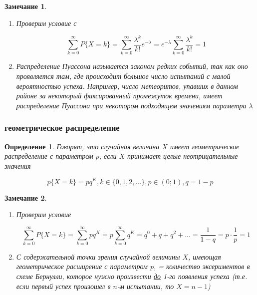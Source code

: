 \documentclass[a4paper, 14pt]{report}
\newtheorem{defenition}{Определение}[section]
\newtheorem{note}{Замечание}[section]
\begin{document}
\begin{note}
    \begin{enumerate}
        \item Проверим условие с 

            $$
            \sum_{k=0}^{\infty} P\{X = k\} = \sum_{k=0}^\infty \frac{\lambda^k}{k!} e^{-\lambda} = e^{-\lambda} \sum_{k=0}^\infty \frac{\lambda^k}{k!} = 1
            $$

        \item Распределение Пуассона называется законом редких событий, так как оно проявляется там, где происходит большое число испытаний с малой вероятностью успеха. Например, число метеоритов, упавших в данном районе за некоторый фиксированный промежуток времени, имеет распределение Пуассона при некотором подходящем значениям параметра $\lambda$
    \end{enumerate}
\end{note}


\subsubsection{геометрическое распределение}

\begin{defenition}
    Говорят, что случайная величина $X$ имеет геометрическое распределение с параметром $p$, если $X$ принимает целые неотрицательные значения

    $$
    p\{X=k\} = pq^K, k \in \{0,1,2, ...\}, p\in(0;1), q = 1-p
    $$
\end{defenition}

\begin{note}
    \begin{enumerate}
        \item Проверим условие

            $$
            \sum_{k=0}^\infty P\{X=k\} = \sum_{k=0}^\infty pq^K = p \sum_{k=0}^\infty q^K = q^0+q+q^2+...=\frac{1}{1-q}=p \cdot \frac{1}{p} = 1
            $$

        \item С содержательной точки зрения случайной величины $X$, имеющая геометрическое расширение с параметром $p$, = количество эксериментов в схеме Бернулли, которое нужно произвести \underline{до} 1-го появления успеха (т.е. если первый успех произошел в $n$-м испытании, то $X=n-1$)
    \end{enumerate}

\end{note}
\end{document}
